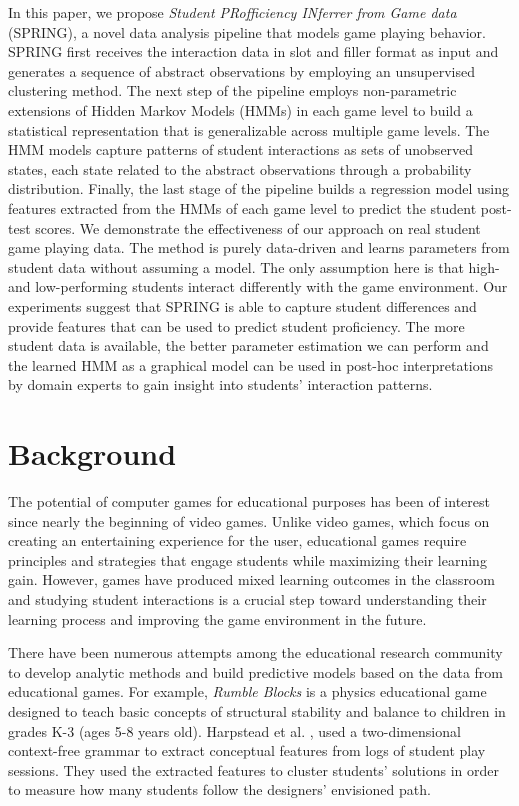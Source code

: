 \documentclass{sigchi}
\def\algname{SPRING\xspace}
\begin{document}
In this paper, we propose \textit{Student PRofficiency INferrer from Game data} (SPRING), a novel data analysis pipeline that models game playing behavior.
\algname first receives the interaction data in slot and filler format as input and generates a sequence of abstract observations by employing an unsupervised clustering method. 
The next step of the pipeline employs non-parametric extensions of Hidden Markov Models (HMMs) in each game level to build a statistical representation that is generalizable across multiple game levels. 
The HMM models capture patterns of student interactions as sets of unobserved states, each state related to the abstract observations through a probability distribution. 
Finally, the last stage of the pipeline builds a regression model using features extracted from the HMMs of each game level to predict the student post-test scores.
We demonstrate the effectiveness of our approach on real student game playing data.
The method is purely data-driven and learns parameters from student data without assuming a model. 
The only assumption here is that high- and low-performing students interact differently with the game environment.
Our experiments suggest that \algname is able to capture student differences and provide features that can be used to predict student proficiency.
The more student data is available, the better parameter estimation we can perform and the learned HMM as a graphical model can be used in post-hoc interpretations by domain experts to gain insight into students' interaction patterns.

\section{Background}
The potential of computer games for educational purposes has been of interest since nearly the beginning of video games. Unlike video games, which focus on creating an entertaining experience for the user, educational games require principles and strategies that engage students while maximizing their learning gain. However, games have produced mixed learning outcomes in the classroom \cite{harpstead2013search,mayo2009video} and studying student interactions is a crucial step toward understanding their learning process and improving the game environment in the future.

There have been numerous attempts among the educational research community to develop analytic methods and build predictive models based on the data from educational games. For example, \textit {Rumble Blocks} \cite{christel2012rumbleblocks} is a physics educational game designed to teach basic concepts of structural stability and balance to children in grades K-3 (ages 5-8 years old). Harpstead et al. \cite{harpstead2013investigating}, used a two-dimensional context-free grammar to extract conceptual features from  logs of student play sessions. They used the extracted features to cluster students' solutions in order to measure how many students follow the designers' envisioned path.
\end{document}
